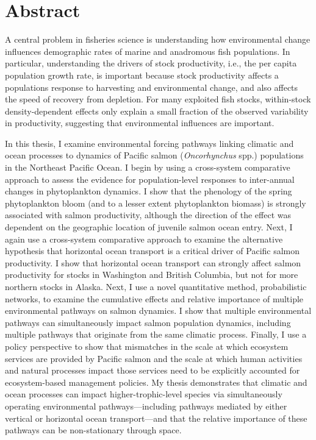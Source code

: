 %
%
%


\chapter*{Abstract}


A central problem in fisheries science is understanding how environmental change
influences demographic rates of marine and anadromous fish populations. In
particular, understanding the drivers of stock productivity, i.e., the per
capita population growth rate, is important because stock productivity affects a
populations response to harvesting and environmental change, and also affects
the speed of recovery from depletion. For many exploited fish stocks,
within-stock density-dependent effects only explain a small fraction of the
observed variability in productivity, suggesting that environmental influences
are important.

In this thesis, I examine environmental forcing pathways linking climatic and
ocean processes to dynamics of Pacific salmon (\textit{Oncorhynchus} spp.)
populations in the Northeast Pacific Ocean. I begin by using a cross-system
comparative approach to assess the evidence for population-level responses to
inter-annual changes in phytoplankton dynamics. I show that the phenology of the
spring phytoplankton bloom (and to a lesser extent phytoplankton biomass) is
strongly associated with salmon productivity, although the direction of the
effect was dependent on the geographic location of juvenile salmon ocean entry.
Next, I again use a cross-system comparative approach to examine the alternative
hypothesis that horizontal ocean transport is a critical driver of Pacific
salmon productivity. I show that horizontal ocean transport can strongly affect
salmon productivity for stocks in Washington and British Columbia, but not for
more northern stocks in Alaska. Next, I use a novel quantitative method,
probabilistic networks, to examine the cumulative effects and relative
importance of multiple environmental pathways on salmon dynamics. I show that
multiple environmental pathways can simultaneously impact salmon population
dynamics, including multiple pathways that originate from the same climatic
process. Finally, I use a policy perspective to show that mismatches in the
scale at which ecosystem services are provided by Pacific salmon and the scale
at which human activities and natural processes impact those services need to be
explicitly accounted for ecosystem-based management policies. My thesis
demonstrates that climatic and ocean processes can impact higher-trophic-level
species via simultaneously operating environmental pathways---including pathways
mediated by either vertical or horizontal ocean transport---and that the
relative importance of these pathways can be non-stationary through space.
